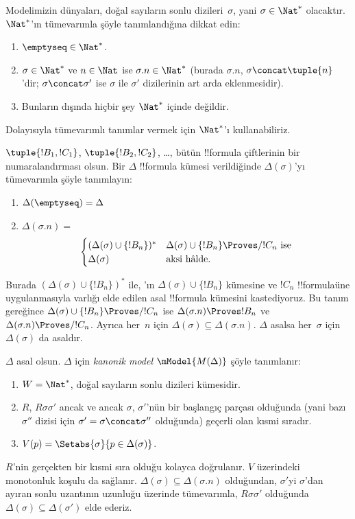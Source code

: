 \documentclass[../../../include/open-logic-section]{subfiles}
\begin{document}


Modelimizin dünyaları, doğal sayıların sonlu dizileri~$\sigma$, yani
$\sigma\in\Nat^*$ olacaktır. $\Nat^*$'ın tümevarımla şöyle tanımlandığına
dikkat edin:
\begin{enumerate}
\item $\emptyseq\in\Nat^*$.
\item $\sigma\in\Nat^*$ ve $n\in\Nat$ ise $\sigma.n\in\Nat^*$ (burada
  $\sigma.n$, $\sigma\concat\tuple{n}$'dir; $\sigma\concat\sigma'$ ise
  $\sigma$ ile $\sigma'$ dizilerinin art arda eklenmesidir).
\item Bunların dışında hiçbir şey $\Nat^*$ içinde değildir.
\end{enumerate}
Dolayısıyla tümevarımlı tanımlar vermek için $\Nat^*$'ı kullanabiliriz.

$\tuple{!B_1,!C_1}$, $\tuple{!B_2,!C_2}$, \dots, bütün !!{formula}
çiftlerinin bir numaralandırması olsun. Bir $\Delta$ !!{formula} kümesi
verildiğinde $\Delta(\sigma)$'yı tümevarımla şöyle tanımlayın:
\begin{enumerate}
\item $\Delta(\emptyseq)=\Delta$
\item $\Delta(\sigma.n)={}$
  \[
  \begin{cases}
    (\Delta(\sigma) \cup \{!B_n\})^* &
    \text{$\Delta(\sigma)\cup\{!B_n\}\Proves/ !C_n$ ise} \\
    \Delta(\sigma) & \text{aksi hâlde.}
  \end{cases}
  \]
\end{enumerate}
Burada $(\Delta(\sigma)\cup\{!B_n\})^*$ ile,
'ın $\Delta(\sigma)\cup\{!B_n\}$ kümesine
ve $!C_n$ !!{formula}{}üne uygulanmasıyla varlığı elde edilen asal
!!{formula} kümesini kastediyoruz. Bu tanım gereğince
$\Delta(\sigma)\cup\{!B_n\}\Proves/ !C_n$ ise
$\Delta(\sigma.n)\Proves !B_n$ ve $\Delta(\sigma.n)\Proves/ !C_n$.
Ayrıca her~$n$ için $\Delta(\sigma)\subseteq\Delta(\sigma.n)$.
$\Delta$ asalsa her~$\sigma$ için $\Delta(\sigma)$ da asaldır.

\begin{defn}
  $\Delta$ asal olsun. $\Delta$ için \emph{kanonik model}
  $\mModel{M(\Delta)}$ şöyle tanımlanır:
  \begin{enumerate}
  \item $W=\Nat^*$, doğal sayıların sonlu dizileri kümesidir.
  \item $R$, $R\sigma\sigma'$ ancak ve ancak $\sigma$, $\sigma'$'nün bir
    başlangıç parçası olduğunda (yani bazı $\sigma''$ dizisi için
    $\sigma'=\sigma\concat\sigma''$ olduğunda) geçerli olan kısmi sıradır.
  \item $V(p)=\Setabs{\sigma}{p\in\Delta(\sigma)}$.
  \end{enumerate}
\end{defn}

$R$'nin gerçekten bir kısmi sıra olduğu kolayca doğrulanır. $V$ üzerindeki
  monotonluk koşulu da sağlanır. $\Delta(\sigma)\subseteq\Delta(\sigma.n)$
  olduğundan, $\sigma'$yi $\sigma$'dan ayıran sonlu uzantının uzunluğu
  üzerinde tümevarımla, $R\sigma\sigma'$ olduğunda
  $\Delta(\sigma)\subseteq\Delta(\sigma')$ elde ederiz.
\end{document}
